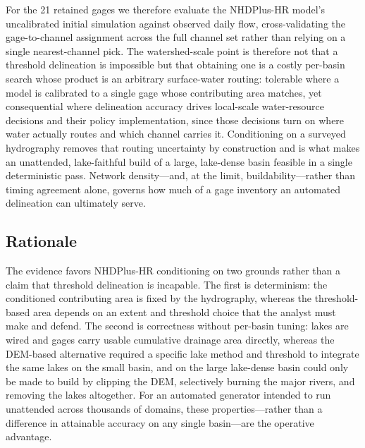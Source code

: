 For the 21 retained gages we therefore evaluate the NHDPlus-HR model's uncalibrated initial simulation against observed daily flow, cross-validating the gage-to-channel assignment across the full channel set rather than relying on a single nearest-channel pick.
The watershed-scale point is therefore not that a threshold delineation is impossible but that obtaining one is a costly per-basin search whose product is an arbitrary surface-water routing: tolerable where a model is calibrated to a single gage whose contributing area matches, yet consequential where delineation accuracy drives local-scale water-resource decisions and their policy implementation, since those decisions turn on where water actually routes and which channel carries it. Conditioning on a surveyed hydrography removes that routing uncertainty by construction and is what makes an unattended, lake-faithful build of a large, lake-dense basin feasible in a single deterministic pass.
Network density---and, at the limit, buildability---rather than timing agreement alone, governs how much of a gage inventory an automated delineation can ultimately serve.

\subsection{Rationale}
The evidence favors NHDPlus-HR conditioning on two grounds rather than a claim that threshold delineation is incapable.
The first is determinism: the conditioned contributing area is fixed by the hydrography, whereas the threshold-based area depends on an extent and threshold choice that the analyst must make and defend.
The second is correctness without per-basin tuning: lakes are wired and gages carry usable cumulative drainage area directly, whereas the DEM-based alternative required a specific lake method and threshold to integrate the same lakes on the small basin, and on the large lake-dense basin could only be made to build by clipping the DEM, selectively burning the major rivers, and removing the lakes altogether.
For an automated generator intended to run unattended across thousands of domains, these properties---rather than a difference in attainable accuracy on any single basin---are the operative advantage.
